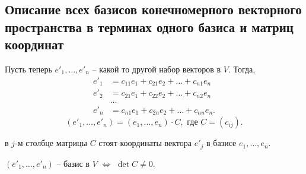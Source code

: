 \subsection{Описание всех базисов конечномерного векторного пространства в терминах одного базиса и матриц координат}

Пусть теперь $e'_1, \dots, e'_n$ -- какой то другой набор векторов в $V$. Тогда,
\begin{align*}
    e'_1 &= c_{11} e_1 + c_{21} e_2 + \dots + c_{n1} e_n \\
    e'_2 &= c_{21} e_1 + c_{22} e_2 + \dots + c_{n2} e_n \\
    &\dots \\
    e'_n &= c_{n1} e_1 + c_{2n} e_2 + \dots + c_{nn} e_n
.\end{align*}
\begin{equation*}
    (e'_1, \dots, e'_n) = (e_1, \dots, e_n) \cdot C, \text{ где } C = (c_{ij})
.\end{equation*}

в $j$-м столбце матрицы $C$ стоят координаты вектора $e'_j$ в базисе $e_1, \dots, e_n$.

\begin{proposal}
    $(e'_1, \dots, e'_n)$ -- базис в $V$ $\iff$ $\det C \neq 0$.
\end{proposal}


